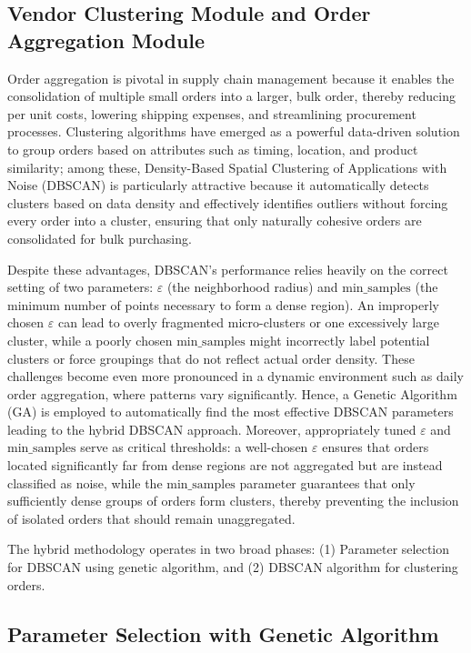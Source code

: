 \subsection{Vendor Clustering Module and Order Aggregation Module}

Order aggregation is pivotal in supply chain management because it enables the consolidation of multiple small orders into a larger, bulk order, thereby reducing per unit costs, lowering shipping expenses, and streamlining procurement processes. Clustering algorithms have emerged as a powerful data-driven solution to group orders based on attributes such as timing, location, and product similarity; among these, Density-Based Spatial Clustering of Applications with Noise (DBSCAN) is particularly attractive because it automatically detects clusters based on data density and effectively identifies outliers without forcing every order into a cluster, ensuring that only naturally cohesive orders are consolidated for bulk purchasing.

Despite these advantages, DBSCAN's performance relies heavily on the correct setting of two parameters: $\varepsilon$ (the neighborhood radius) and $\text{min\_samples}$ (the minimum number of points necessary to form a dense region). An improperly chosen $\varepsilon$ can lead to overly fragmented micro-clusters or one excessively large cluster, while a poorly chosen $\text{min\_samples}$ might incorrectly label potential clusters or force groupings that do not reflect actual order density. These challenges become even more pronounced in a dynamic environment such as daily order aggregation, where patterns vary significantly. Hence, a Genetic Algorithm (GA) is employed to automatically find the most effective DBSCAN parameters leading to the hybrid DBSCAN approach. Moreover, appropriately tuned $\varepsilon$ and $\text{min\_samples}$ serve as critical thresholds: a well-chosen $\varepsilon$ ensures that orders located significantly far from dense regions are not aggregated but are instead classified as noise, while the $\text{min\_samples}$ parameter guarantees that only sufficiently dense groups of orders form clusters, thereby preventing the inclusion of isolated orders that should remain unaggregated.

The hybrid methodology operates in two broad phases: (1) Parameter selection for DBSCAN using genetic algorithm, and (2) DBSCAN algorithm for clustering orders.

\subsection{Parameter Selection with Genetic Algorithm}

